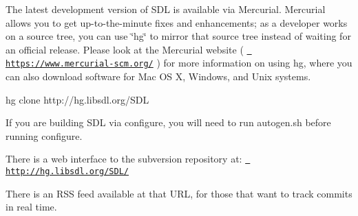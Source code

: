The latest development version of S\+DL is available via Mercurial. Mercurial allows you to get up-\/to-\/the-\/minute fixes and enhancements; as a developer works on a source tree, you can use \char`\"{}hg\char`\"{} to mirror that source tree instead of waiting for an official release. Please look at the Mercurial website ( \href{https://www.mercurial-scm.org/}{\texttt{ https\+://www.\+mercurial-\/scm.\+org/}} ) for more information on using hg, where you can also download software for Mac OS X, Windows, and Unix systems. \begin{DoxyVerb}hg clone http://hg.libsdl.org/SDL
\end{DoxyVerb}


If you are building S\+DL via configure, you will need to run autogen.\+sh before running configure.

There is a web interface to the subversion repository at\+: \href{http://hg.libsdl.org/SDL/}{\texttt{ http\+://hg.\+libsdl.\+org/\+S\+D\+L/}}

There is an R\+SS feed available at that U\+RL, for those that want to track commits in real time. 